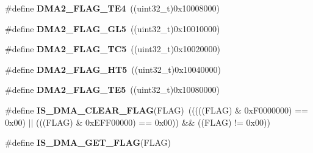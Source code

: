 \begin{DoxyCompactItemize}
\item 
\hypertarget{group__DMA__flags__definition_gac1178b804cad45fe82236dbd2c25cc64}{
\#define {\bfseries DMA2\_\-FLAG\_\-TE4}~((uint32\_\-t)0x10008000)}
\label{group__DMA__flags__definition_gac1178b804cad45fe82236dbd2c25cc64}

\item 
\hypertarget{group__DMA__flags__definition_gab0468b7a6e2fbdd5428da87252865623}{
\#define {\bfseries DMA2\_\-FLAG\_\-GL5}~((uint32\_\-t)0x10010000)}
\label{group__DMA__flags__definition_gab0468b7a6e2fbdd5428da87252865623}

\item 
\hypertarget{group__DMA__flags__definition_ga5ba4dce652a1a29bedbd7d8dc35ca4ec}{
\#define {\bfseries DMA2\_\-FLAG\_\-TC5}~((uint32\_\-t)0x10020000)}
\label{group__DMA__flags__definition_ga5ba4dce652a1a29bedbd7d8dc35ca4ec}

\item 
\hypertarget{group__DMA__flags__definition_ga23aabf34428e04d7b46368e0b595a4d5}{
\#define {\bfseries DMA2\_\-FLAG\_\-HT5}~((uint32\_\-t)0x10040000)}
\label{group__DMA__flags__definition_ga23aabf34428e04d7b46368e0b595a4d5}

\item 
\hypertarget{group__DMA__flags__definition_gae57659b4349d03eb70db63bb2aa40505}{
\#define {\bfseries DMA2\_\-FLAG\_\-TE5}~((uint32\_\-t)0x10080000)}
\label{group__DMA__flags__definition_gae57659b4349d03eb70db63bb2aa40505}

\item 
\hypertarget{group__DMA__flags__definition_ga4b33e418489c9a3c9adcbdbaca93e4a3}{
\#define {\bfseries IS\_\-DMA\_\-CLEAR\_\-FLAG}(FLAG)~(((((FLAG) \& 0xF0000000) == 0x00) $|$$|$ (((FLAG) \& 0xEFF00000) == 0x00)) \&\& ((FLAG) != 0x00))}
\label{group__DMA__flags__definition_ga4b33e418489c9a3c9adcbdbaca93e4a3}

\item 
\#define {\bfseries IS\_\-DMA\_\-GET\_\-FLAG}(FLAG)
\end{DoxyCompactItemize}


